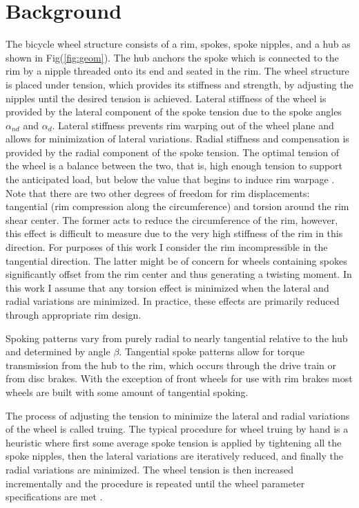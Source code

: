 \documentclass[journal]{IEEEtran}
\begin{document}
\section{Background}
The bicycle wheel structure consists of a rim, spokes, spoke nipples, and a hub as shown in Fig(\ref{fig:geom}).  The hub anchors the spoke which is connected to the rim by a nipple threaded onto its end and seated in the rim. The wheel structure is placed under tension, which provides its stiffness and strength, by adjusting the nipples until the desired tension is achieved. Lateral stiffness of the wheel is provided by the lateral component of the spoke tension due to the spoke angles $\alpha_{nd}$ and $\alpha_d$. Lateral stiffness prevents rim warping out of the wheel plane and allows for minimization of lateral variations. Radial stiffness and compensation is provided by the radial component of the spoke tension. The optimal tension of the wheel is a balance between the two, that is, high enough tension to support the anticipated load, but below the value that begins to induce rim warpage \cite{FordThesis}. Note that there are two other degrees of freedom for rim displacements:  tangential (rim compression along the circumference) and torsion around the rim shear center.  The former acts to reduce the circumference of the rim, however, this effect is difficult to measure due to the very high stiffness of the rim in this direction.  For purposes of this work I consider the rim incompressible in the tangential direction. The latter might be of concern for wheels containing spokes significantly offset from the rim center and thus generating a twisting moment.  In this work I assume that any torsion effect is minimized when the lateral and radial variations are minimized. In practice, these effects are primarily reduced through appropriate rim design.

Spoking patterns vary from purely radial to nearly tangential relative to the hub and determined by angle $\beta$.  Tangential spoke patterns allow for torque transmission from the hub to the rim, which occurs through the drive train or from disc brakes.  With the exception of front wheels for use with rim brakes most wheels are built with some amount of tangential spoking. 

The process of adjusting the tension to minimize the lateral and radial variations of the wheel is called truing. The typical procedure for wheel truing by hand is a heuristic where first some average spoke tension is applied by tightening all the spoke nipples, then the lateral variations are iteratively reduced, and finally the radial variations are minimized. The wheel tension is then increased incrementally and the procedure is repeated until the wheel parameter specifications are met \cite{Brandt}.
\end{document}
